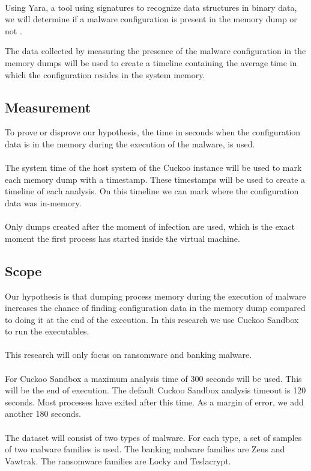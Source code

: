 \documentclass[conference]{IEEEtran}
\begin{document}
\ \\Using Yara, a tool using signatures to recognize data structures in binary  data, we will determine if a malware configuration is present in the memory dump or not \cite{roberston-ioc}.

The data collected by measuring the presence of the malware configuration in the memory dumps will be used to create a timeline containing the average time in which the configuration resides in the system memory.


\subsection{Measurement}
To prove or disprove our hypothesis, the time in seconds when the \Gls{configuration data} is in the memory during the execution of the malware, is used. \\\\The system time of the host system of the Cuckoo instance will be used to mark each memory dump with a timestamp. These timestamps will be used to create a timeline of each analysis. On this timeline we can mark where the \Gls{configuration data} was in-memory.\\\\Only dumps created after the moment of infection are used, which is the exact moment the first process has started inside the virtual machine.


\subsection{Scope}
Our hypothesis is that dumping process memory during the execution of malware increases the chance of finding \Gls{configuration data} in the memory dump compared to doing it at the end of the execution. In this research we use Cuckoo Sandbox to run the executables. \\\\This research will only focus on ransomware and banking malware. \\\\For Cuckoo Sandbox a maximum analysis time of 300 seconds will be used. This will be the end of execution. The default Cuckoo Sandbox analysis timeout is 120 seconds. Most processes have exited after this time. As a margin of error, we add another 180 seconds. \\\\The dataset will consist of two types of malware. For each type, a set of samples of two malware families is used. The banking malware families are Zeus and Vawtrak. The ransomware families are Locky and Teslacrypt.
\end{document}
